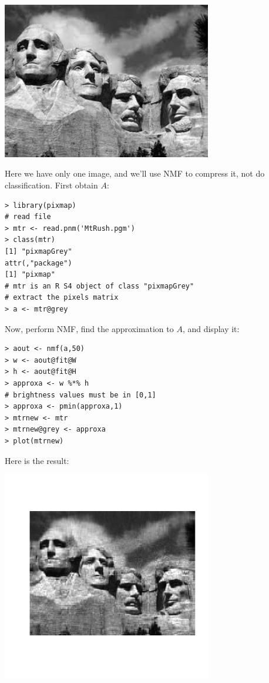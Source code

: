 \includegraphics[width=3.6in]{Images/MtRush.png}

Here we have only one image, and we'll use NMF to compress it, not do
classification.  First obtain $A$:

\begin{lstlisting}
> library(pixmap) 
# read file
> mtr <- read.pnm('MtRush.pgm') 
> class(mtr)
[1] "pixmapGrey"
attr(,"package")
[1] "pixmap"
# mtr is an R S4 object of class "pixmapGrey"
# extract the pixels matrix
> a <- mtr@grey
\end{lstlisting}

Now, perform NMF, find the approximation to $A$, and display it:

\begin{lstlisting}
> aout <- nmf(a,50)
> w <- aout@fit@W
> h <- aout@fit@H
> approxa <- w %*% h
# brightness values must be in [0,1]
> approxa <- pmin(approxa,1) 
> mtrnew <- mtr
> mtrnew@grey <- approxa 
> plot(mtrnew) 
\end{lstlisting}

Here is the result:

\includegraphics[width=3.6in]{Images/MtRush50.png}

